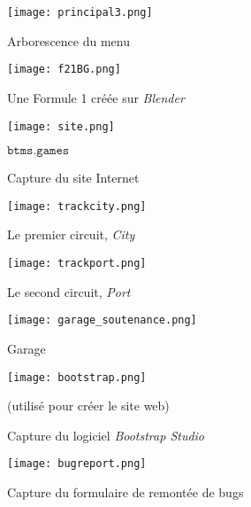 \documentclass[a4paper,12pt]{article}
\newcommand{\SITE}{\(\mathtt{btms.games}\)}
\begin{document}
    \begin{figure}[h]
        \centering
        \texttt{[image: principal3.png]}
        \caption{Arborescence du menu}
    \end{figure}

    \begin{figure}[h]
        \texttt{[image: f21BG.png]}
        \caption{Une Formule 1 créée sur \textsl{Blender}}
        \centering
    \end{figure}

    \begin{figure}[t]
        \centering
        \texttt{[image: site.png]}
        \caption{Capture du site Internet}
        \SITE
    \end{figure}

    \begin{figure}[t]
        \centering
        \texttt{[image: trackcity.png]}
        \caption{Le premier circuit, \textsl{City}}
    \end{figure}

    \begin{figure}[t]
        \centering
        \texttt{[image: trackport.png]}
        \caption{Le second circuit, \textsl{Port}}
    \end{figure}

    \begin{figure}
        \centering
        \texttt{[image: garage\_soutenance.png]}
        \caption{Garage}
    \end{figure}

    \begin{figure}[h]
        \centering
        \texttt{[image: bootstrap.png]}
        \caption{Capture du logiciel \textsl{Bootstrap Studio}}
        (utilisé pour créer le site web)
    \end{figure}

    \begin{figure}[t]
        \centering
        \texttt{[image: bugreport.png]}
        \caption{Capture du formulaire de remontée de bugs}
    \end{figure}
\end{document}
